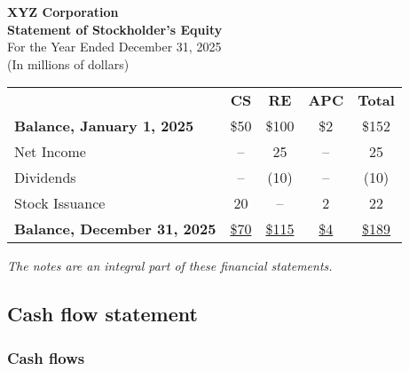 \begin{tcolorbox}[colframe=black,colback=white,title=Example Statement of Stockholder's Equity]
    \begin{center}
        \textbf{XYZ Corporation}\\
        \textbf{Statement of Stockholder's Equity}\\
        For the Year Ended December 31, 2025\\
        (In millions of dollars)
    \end{center}

    \begin{tabular}{lcccc}
                                            & \textbf{CS}      & \textbf{RE}       & \textbf{APC}    & \textbf{Total}                \\
        \textbf{Balance, January 1, 2025}   & \$50             & \$100             & \$2             & \$152                         \\
        Net Income                          & --               & 25                & --              & 25                            \\
        Dividends                           & --               & (10)              & --              & (10)                          \\
        Stock Issuance                      & 20               & --                & 2               & 22                            \\
        \textbf{Balance, December 31, 2025} & \underline{\$70} & \underline{\$115} & \underline{\$4} & \underline{\underline{\$189}} \\
    \end{tabular}

    \vspace{1em}

    \textit{\footnotesize{The notes are an integral part of these financial statements.}}
\end{tcolorbox}

\normalsize

\subsection{Cash flow statement}

\subsubsection{Cash flows}

